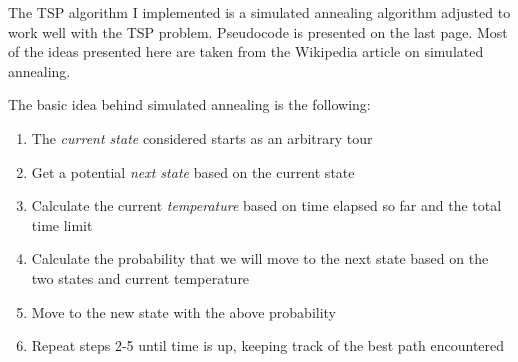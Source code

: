 \documentclass[11pt,letterpaper]{article}
\begin{document}
The TSP algorithm I implemented is a simulated annealing algorithm adjusted to work well with the TSP problem. Pseudocode is presented on the last page. Most of the ideas presented here are taken from the Wikipedia article on simulated annealing.

The basic idea behind simulated annealing is the following:
\begin{enumerate}
\item The \textit{current state} considered starts as an arbitrary tour
\item Get a potential \textit{next state} based on the current state 
\item Calculate the current \textit{temperature} based on time elapsed so far and the total time limit 
\item Calculate the probability that we will move to the next state based on the two states and current temperature
\item Move to the new state with the above probability
\item Repeat steps 2-5 until time is up, keeping track of the best path encountered
\end{enumerate}
\end{document}
